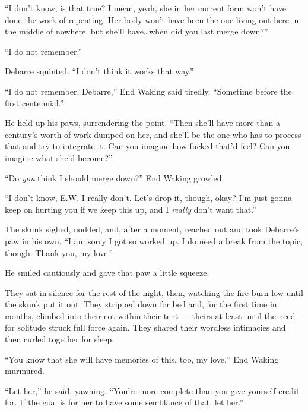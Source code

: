 ``I don't know, is that true? I mean, yeah, she in her current form won't have done the work of repenting. Her body won't have been the one living out here in the middle of nowhere, but she'll have\ldots when did you last merge down?''

``I do not remember.''

Debarre squinted. ``I don't think it works that way.''

``I do not remember, Debarre,'' End Waking said tiredly. ``Sometime before the first centennial.''

He held up his paws, surrendering the point. ``Then she'll have more than a century's worth of work dumped on her, and she'll be the one who has to process that and try to integrate it. Can you imagine how fucked that'd feel? Can you imagine what she'd become?''

``Do \emph{you} think I should merge down?'' End Waking growled.

``I don't know, E.W. I really don't. Let's drop it, though, okay? I'm just gonna keep on hurting you if we keep this up, and I \emph{really} don't want that.''

The skunk sighed, nodded, and, after a moment, reached out and took Debarre's paw in his own. ``I am sorry I got so worked up. I do need a break from the topic, though. Thank you, my love.''

He smiled cautiously and gave that paw a little squeeze.

They sat in silence for the rest of the night, then, watching the fire burn low until the skunk put it out. They stripped down for bed and, for the first time in months, climbed into their cot within their tent — theirs at least until the need for solitude struck full force again. They shared their wordless intimacies and then curled together for sleep.

``You know that she will have memories of this, too, my love,'' End Waking murmured.

``Let her,'' he said, yawning. ``You're more complete than you give yourself credit for. If the goal is for her to have some semblance of that, let her.''

